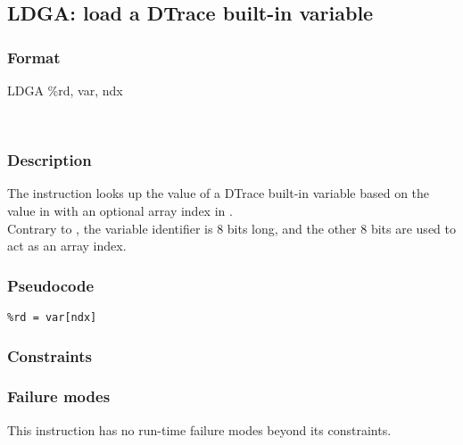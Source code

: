 \clearpage
{}
{}
\label{insn:ldga}
\subsection*{LDGA: load a DTrace built-in variable}

\subsubsection*{Format}

\textrm{LDGA \%rd, var, ndx}

\begin{center}
	\begin{bytefield}[endianness=big,bitformatting=\scriptsize]{32}
	\\
	\end{bytefield}
\end{center}

\subsubsection*{Description}

The  instruction looks up the value of a DTrace
built-in variable based on the value in  with an
optional array index in . \\

Contrary to  , the variable identifier is 8 bits long, and the other 8 bits are used to act as an array index.

\subsubsection*{Pseudocode}

\begin{verbatim}
%rd = var[ndx]
\end{verbatim}

\subsubsection*{Constraints}

\subsubsection*{Failure modes}

This instruction has no run-time failure modes beyond its constraints.
